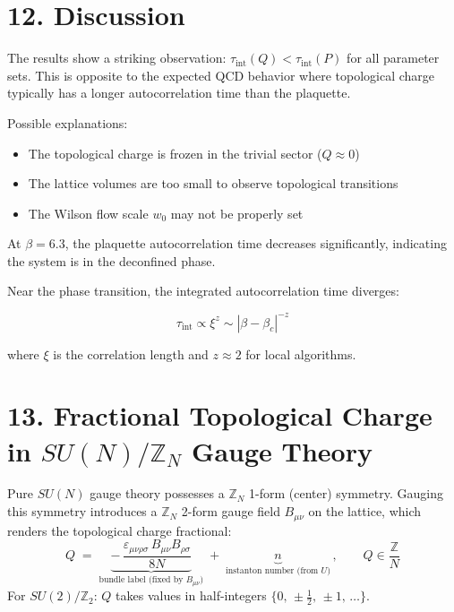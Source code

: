 \documentclass[12pt,a4paper]{article}
\begin{document}
\section*{12. Discussion}

The results show a striking observation: $\tau_{\text{int}}(Q) < \tau_{\text{int}}(P)$ for all parameter sets. This is opposite to the expected QCD behavior where topological charge typically has a longer autocorrelation time than the plaquette.

Possible explanations:
\begin{itemize}
\item The topological charge is frozen in the trivial sector ($Q \approx 0$)
\item The lattice volumes are too small to observe topological transitions
\item The Wilson flow scale $w_0$ may not be properly set
\end{itemize}

At $\beta=6.3$, the plaquette autocorrelation time decreases significantly, indicating the system is in the deconfined phase.

Near the phase transition, the integrated autocorrelation time diverges:

\begin{equation}
\tau_{\text{int}} \propto \xi^z \sim |\beta - \beta_c|^{-z}
\end{equation}

where $\xi$ is the correlation length and $z \approx 2$ for local algorithms.


\newpage
\section*{13. Fractional Topological Charge in $SU(N)/\mathbb{Z}_N$ Gauge Theory}

Pure $SU(N)$ gauge theory possesses a $\mathbb{Z}_N$ 1-form (center) symmetry.
Gauging this symmetry introduces a $\mathbb{Z}_N$ 2-form gauge field $B_{\mu\nu}$ on the lattice,
which renders the topological charge fractional:
\begin{equation}
  Q \;=\; \underbrace{-\,\frac{\varepsilon_{\mu\nu\rho\sigma}\,B_{\mu\nu}B_{\rho\sigma}}{8N}}_{\text{bundle label (fixed by }B_{\mu\nu}\text{)}}
       \;+\; \underbrace{n}_{\text{instanton number (from }U\text{)}}
  \,,\qquad Q \in \frac{\mathbb{Z}}{N}
\end{equation}
For $SU(2)/\mathbb{Z}_2$: $Q$ takes values in half-integers $\{0,\,\pm\tfrac{1}{2},\,\pm1,\,\ldots\}$.
\end{document}
